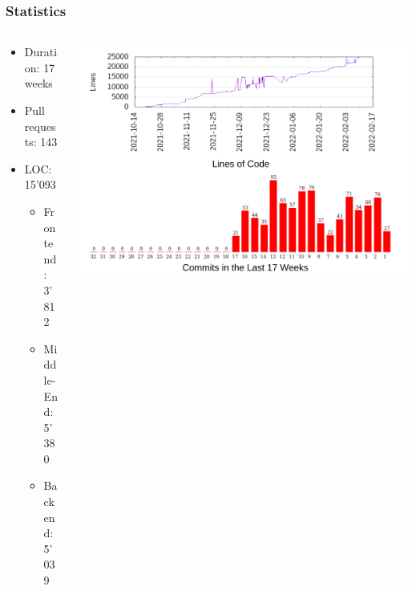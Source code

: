 \documentclass[navbaroff,en]{sdqbeamer}
\begin{document}
\begin{frame}
	\frametitle{Statistics}

	\begin{columns}
		\begin{column}{0.3\textwidth}
			\begin{itemize}
				\item Duration: 17 weeks
				\item Pull requests: 143
				\item LOC: 15'093
				\begin{itemize}
					\item Frontend: 3'812
					\item Middle-End: 5'380
					\item Backend: 5'039
				\end{itemize}
			\end{itemize}
		\end{column}

		\begin{column}{0.7\textwidth}
			\centering \includegraphics[scale=0.43]{images/stats.pdf}
		\end{column}

	\end{columns}


\end{frame}



\end{document}
